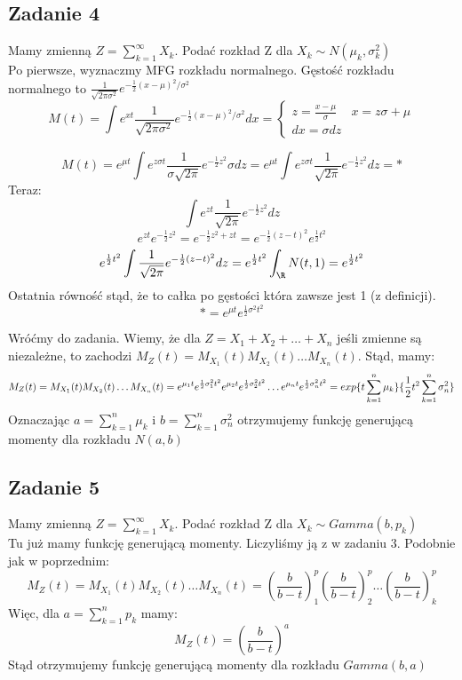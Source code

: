 \documentclass[a4paper]{article}
\DeclarePairedDelimiter\set{\lbrace}{\rbrace}
\begin{document}
\subsection*{Zadanie 4}
Mamy zmienną $Z=\sum\limits_{k=1}^\infty X_k$. Podać rozkład Z dla $X_k \sim N(\mu_k, \sigma_k^2)$\\

Po pierwsze, wyznaczmy MFG rozkładu normalnego. Gęstość rozkładu normalnego to $\frac{1}{\sqrt{2\pi \sigma^2 }} e^{-\frac{1}{2}(x-\mu)^2/\sigma^2}$
$$M(t)=\int e^{xt} \frac{1}{\sqrt{2\pi \sigma^2 }} e^{-\frac{1}{2}(x-\mu)^2/\sigma^2} dx = \left\{\begin{matrix}
z=\frac{x-\mu}{\sigma} & x=z\sigma + \mu \\ 
dx=\sigma dz & 
\end{matrix}\right.$$

$$M(t)=e^{\mu t}\int e^{z\sigma t} \frac{1}{\sigma \sqrt{2\pi}}e^{-\frac{1}{2}z^2} \sigma dz = e^{\mu t}\int e^{z\sigma t} \frac{1}{\sqrt{2\pi}}e^{-\frac{1}{2}z^2} dz = *$$
Teraz:
$$\int e^{z t} \frac{1}{\sqrt{2\pi}}e^{-\frac{1}{2}z^2} dz $$
$$e^{zt}e^{-\frac{1}{2}z^2} = e^{-\frac{1}{2}z^2 +zt} = e^{-\frac{1}{2}(z-t)^2}e^{\frac{1}{2}t^2}$$
$$e^{\frac{1}{2}t^2} \int \frac{1}{\sqrt{2\pi}}e^{-\frac{1}{2}(z-t)^2} dz = e^{\frac{1}{2}t^2} \int_\R N(t,1) = e^{\frac{1}{2}t^2} $$
Ostatnia równość stąd, że to całka po gęstości która zawsze jest 1 (z definicji).
$$*=e^{\mu t}e^{\frac{1}{2}\sigma^2 t^2} $$

Wróćmy do zadania. Wiemy, że dla  $Z=X_1 + X_2 + \dots + X_n $ jeśli zmienne są niezależne, to zachodzi $M_Z(t)=M_{X_1}(t)M_{X_2}(t)\dots M_{X_n}(t)$. Stąd, mamy:
$$M_Z(t)=M_{X_1}(t)M_{X_2}(t)\dots M_{X_n}(t) = e^{\mu_1 t}e^{\frac{1}{2}\sigma_1^2 t^2} e^{\mu_2 t}e^{\frac{1}{2}\sigma_2^2 t^2}\dots e^{\mu_n t}e^{\frac{1}{2}\sigma_n^2 t^2} = exp \set{t \sum\limits_{k=1}^n \mu_k} \set{\frac{1}{2} t^2 \sum\limits_{k=1}^n \sigma_n^2 }$$
Oznaczając $a=\sum\limits_{k=1}^n \mu_k$ i $b= \sum\limits_{k=1}^n \sigma_n^2$ otrzymujemy funkcję generującą momenty dla rozkładu $N(a,b)$

\subsection*{Zadanie 5}
Mamy zmienną $Z=\sum\limits_{k=1}^\infty X_k$. Podać rozkład Z dla $X_k \sim Gamma(b, p_k)$\\

Tu już mamy funkcję generującą momenty. Liczyliśmy ją z w zadaniu 3. Podobnie jak w poprzednim:
$$M_Z(t)=M_{X_1}(t)M_{X_2}(t)\dots M_{X_n}(t) = \left(\frac{b}{b-t}\right)^p_1 \left(\frac{b}{b-t}\right)^p_2 \dots \left(\frac{b}{b-t}\right)^p_k$$
Więc, dla $a=\sum_{k=1}^n p_k$ mamy:
$$M_Z(t) = \left(\frac{b}{b-t}\right)^a $$
Stąd otrzymujemy funkcję generującą momenty dla rozkładu $Gamma(b,a)$
\end{document}
